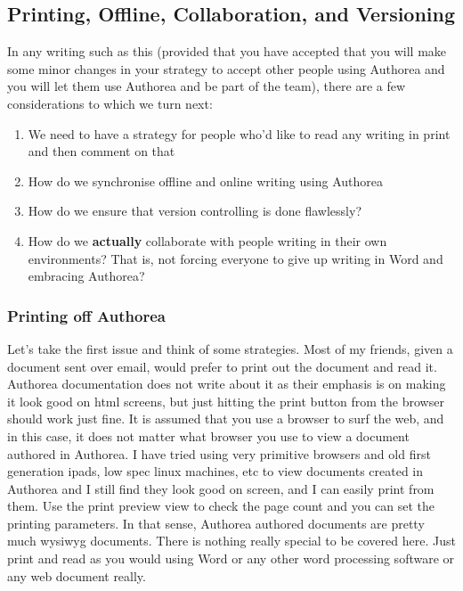 \subsection{Printing, Offline, Collaboration, and Versioning}

In any writing such as this (provided that you have accepted that you will make some minor changes in your strategy to accept other people using Authorea and you will let them use Authorea and be part of the team), there are a few considerations to which we turn next:

\begin{enumerate}
\item We need to have a strategy for people who'd like to read any writing in print and then comment on that
\item How do we synchronise offline and online writing using Authorea
\item How do we ensure that version controlling is done flawlessly?
\item How do we \textbf{actually} collaborate with people writing in their own environments? That is, not forcing everyone to give up writing in Word and embracing Authorea?
\end{enumerate}

\subsubsection{Printing off Authorea}

Let's take the first issue and think of some strategies. Most of my friends, given a document sent over email, would prefer to print out the document and read it. Authorea documentation does not write about it as their emphasis is on making it look good on html screens, but just hitting the print button from the browser should work just fine. It is assumed that you use a browser to surf the web, and in this case, it does not matter what browser you use to view a document authored in Authorea. I have tried using very primitive browsers and old first generation ipads, low spec linux machines, etc to view documents created in Authorea and I still find they look good on screen, and I can easily print from them. Use the print preview view to check the page count and you can set the printing parameters. In that sense, Authorea authored documents are pretty much wysiwyg documents. There is nothing really special to be covered here. Just print and read as you would using Word or any other word processing software or any web document really. 

